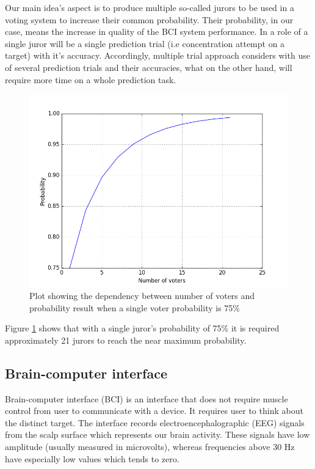 \documentclass[12pt]{article}
\begin{document}
Our main idea's aspect is to produce multiple so-called jurors to be used in a voting system to increase their common probability. Their probability, in our case, means the increase in quality of the BCI system performance. In a role of a single juror will be a single prediction trial (i.e concentration attempt on a target) with it's accuracy. Accordingly, multiple trial approach considers with use of several prediction trials and their accuracies, what on the other hand, will require more time on a whole prediction task.

\begin{figure} [H]
\begin{center}
\includegraphics[width=1\textwidth]{condorcet}
\caption{Plot showing the dependency between number of voters and probability result when a single voter probability is 75\%}
\label{fig:condorcet}
\end{center}
\end{figure}

Figure \ref{fig:condorcet} shows that with a single juror's probability of 75\% it is required approximately 21 jurors to reach the near maximum probability.
\subsection{Brain-computer interface}

Brain-computer interface (BCI) is an interface that does not require muscle control from user to communicate with a device. It requires user to think about the distinct target. The interface records electroencephalographic (EEG) signals from the scalp surface which represents our brain activity. These signals have low amplitude (usually measured in microvolts), whereas frequencies above 30 Hz have especially low values which tends to zero.\cite{bci_vidal}
\end{document}
